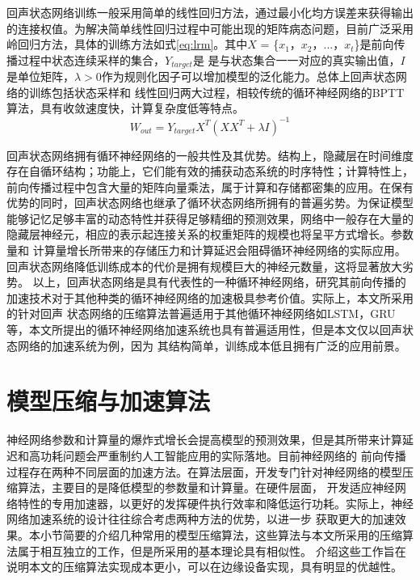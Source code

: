 回声状态网络训练一般采用简单的线性回归方法，通过最小化均方误差来获得输出的连接权值。为解决简单线性回归过程中可能出现的矩阵病态问题，目前广泛采用
岭回归方法，具体的训练方法如式\ref{eq:lrm}。其中\(X\) = \{\(x_1\)，\(x_2\)，...，\(x_t\)\}是前向传播过程中状态连续采样的集合，\(Y_{target}\)是
是与状态集合一一对应的真实输出值，\(I\)是单位矩阵，\( \lambda > 0\)作为规则化因子可以增加模型的泛化能力。总体上回声状态网络的训练包括状态采样和
线性回归两大过程，相较传统的循环神经网络的BPTT算法，具有收敛速度快，计算复杂度低等特点。
\begin{equation}\label{eq:lrm}
	W_{out} = Y_{target} X^{T}(XX^{T} + \lambda I)^{-1}
\end{equation}

回声状态网络拥有循环神经网络的一般共性及其优势。结构上，隐藏层在时间维度存在自循环结构；功能上，它们能有效的捕获动态系统的时序特性；计算特性上，
前向传播过程中包含大量的矩阵向量乘法，属于计算和存储都密集的应用。在保有优势的同时，回声状态网络也继承了循环状态网络所拥有的普遍劣势。为保证模型
能够记忆足够丰富的动态特性并获得足够精细的预测效果，网络中一般存在大量的隐藏层神经元，相应的表示起连接关系的权重矩阵的规模也将呈平方式增长。参数量和
计算量增长所带来的存储压力和计算延迟会阻碍循环神经网络的实际应用。回声状态网络降低训练成本的代价是拥有规模巨大的神经元数量，这将显著放大劣势。
以上，回声状态网络是具有代表性的一种循环神经网络，研究其前向传播的加速技术对于其他种类的循环神经网络的加速极具参考价值。实际上，本文所采用的针对回声
状态网络的压缩算法普遍适用于其他循环神经网络如LSTM，GRU等，本文所提出的循环神经网络加速系统也具有普遍适用性，但是本文仅以回声状态网络的加速系统为例，因为
其结构简单，训练成本低且拥有广泛的应用前景。
\section{模型压缩与加速算法}
神经网络参数和计算量的爆炸式增长会提高模型的预测效果，但是其所带来计算延迟和高功耗问题会严重制约人工智能应用的实际落地。目前神经网络的
前向传播过程存在两种不同层面的加速方法。在算法层面，开发专门针对神经网络的模型压缩算法，主要目的是降低模型的参数量和计算量。在硬件层面，
开发适应神经网络特性的专用加速器，以更好的发挥硬件执行效率和降低运行功耗。实际上，神经网络加速系统的设计往往综合考虑两种方法的优势，以进一步
获取更大的加速效果。本小节简要的介绍几种常用的模型压缩算法，这些算法与本文所采用的压缩算法属于相互独立的工作，但是所采用的基本理论具有相似性。
介绍这些工作旨在说明本文的压缩算法实现成本更小，可以在边缘设备实现，具有明显的优越性。

